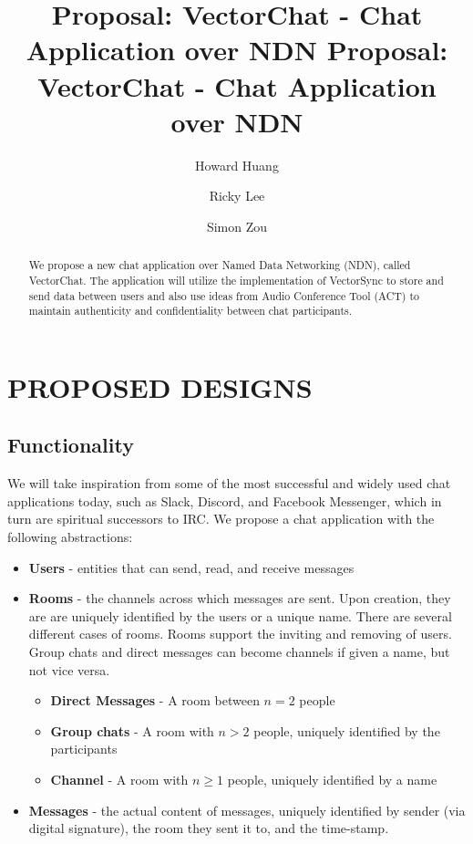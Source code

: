 \documentclass[letterpaper, 10 pt, conference]{ieeeconf}  %
\title{\LARGE \bf
Proposal: VectorChat - Chat Application over NDN
}
\begin{document}
\author{Howard Huang}
\author{Ricky Lee}
\author{Simon Zou}

\title{\LARGE \bf
Proposal: VectorChat - Chat Application over NDN
}
\maketitle


\begin{abstract}

We propose a new chat application over Named Data Networking (NDN), called VectorChat. The application will utilize the implementation of VectorSync to store and send data between users and also use ideas from Audio Conference Tool (ACT) to maintain authenticity and confidentiality between chat participants.

\end{abstract}

\section{PROPOSED DESIGNS}

\subsection{Functionality}

We will take inspiration from some of the most successful and widely used chat applications today, such as Slack, Discord, and Facebook Messenger, which in turn are spiritual successors to IRC. We propose a chat application with the following abstractions:

\begin{itemize}
\item \textbf{Users} - entities that can send, read, and receive messages
\item \textbf{Rooms} - the channels across which messages are sent. Upon creation, they are are uniquely identified by the users or a unique name. There are several different cases of rooms. Rooms support the inviting and removing of users. Group chats and direct messages can become channels if given a name, but not vice versa.
\begin{itemize}
\item \textbf{Direct Messages} - A room between $n = 2$ people
\item \textbf{Group chats} - A room with $n > 2$ people, uniquely identified by the participants
\item \textbf{Channel} - A room with $n \geq 1$ people, uniquely identified by a name 
\end{itemize}
\item \textbf{Messages} - the actual content of messages, uniquely identified by sender (via digital signature), the room they sent it to, and the time-stamp. 
\end{itemize}
\end{document}
